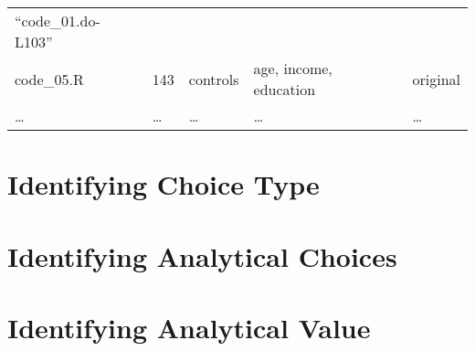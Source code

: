 \documentclass[]{book}
\begin{document}
\begin{longtable}[]{@{}lllll@{}}
\begin{minipage}[t]{0.18\columnwidth}
``code\_01.do-L103''\strut
\end{minipage}\tabularnewline
\begin{minipage}[t]{0.10\columnwidth}\raggedright
code\_05.R\strut
\end{minipage} & \begin{minipage}[t]{0.11\columnwidth}\raggedright
143\strut
\end{minipage} & \begin{minipage}[t]{0.18\columnwidth}\raggedright
controls\strut
\end{minipage} & \begin{minipage}[t]{0.28\columnwidth}\raggedright
age, income, education\strut
\end{minipage} & \begin{minipage}[t]{0.18\columnwidth}\raggedright
original\strut
\end{minipage}\tabularnewline
\begin{minipage}[t]{0.10\columnwidth}\raggedright
\ldots{}\strut
\end{minipage} & \begin{minipage}[t]{0.11\columnwidth}\raggedright
\ldots{}\strut
\end{minipage} & \begin{minipage}[t]{0.18\columnwidth}\raggedright
\ldots{}\strut
\end{minipage} & \begin{minipage}[t]{0.28\columnwidth}\raggedright
\ldots{}\strut
\end{minipage} & \begin{minipage}[t]{0.18\columnwidth}\raggedright
\ldots{}\strut
\end{minipage}\tabularnewline
\bottomrule
\end{longtable}

\hypertarget{id-analy}{%
\section{Identifying Choice Type}\label{id-analy}}

\hypertarget{id-analy}{%
\section{Identifying Analytical Choices}\label{id-analy}}

\hypertarget{id-val}{%
\section{Identifying Analytical Value}\label{id-val}}
\end{document}

